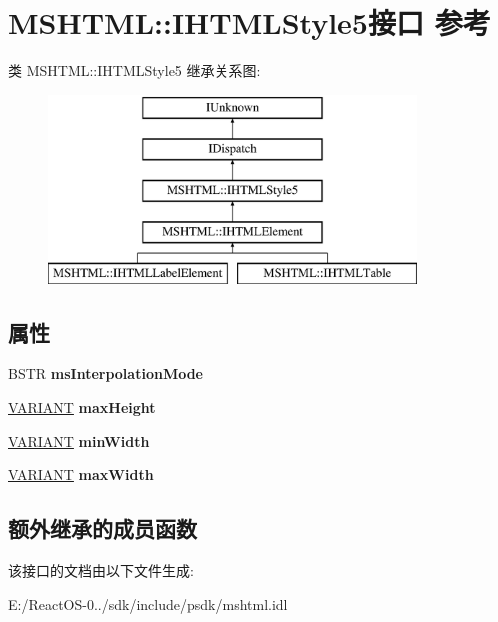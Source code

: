 \hypertarget{interface_m_s_h_t_m_l_1_1_i_h_t_m_l_style5}{}\section{M\+S\+H\+T\+ML\+:\+:I\+H\+T\+M\+L\+Style5接口 参考}
\label{interface_m_s_h_t_m_l_1_1_i_h_t_m_l_style5}
类 M\+S\+H\+T\+ML\+:\+:I\+H\+T\+M\+L\+Style5 继承关系图\+:\begin{figure}[H]
\begin{center}
\leavevmode
\includegraphics[height=5.000000cm]{interface_m_s_h_t_m_l_1_1_i_h_t_m_l_style5}
\end{center}
\end{figure}
\subsection*{属性}
\begin{DoxyCompactItemize}
\item 
\mbox{\label{interface_m_s_h_t_m_l_1_1_i_h_t_m_l_style5_ab35fc7c27cc8a267cf51fcef077536b6}} 
B\+S\+TR {\bfseries ms\+Interpolation\+Mode}
\item 
\mbox{\label{interface_m_s_h_t_m_l_1_1_i_h_t_m_l_style5_a9d135dbc815090c6a2afc8c111ec98e2}} 
\hyperlink{structtag_v_a_r_i_a_n_t}{V\+A\+R\+I\+A\+NT} {\bfseries max\+Height}
\item 
\mbox{\label{interface_m_s_h_t_m_l_1_1_i_h_t_m_l_style5_adfc20d7ec1f38cf79634531f1e138b78}} 
\hyperlink{structtag_v_a_r_i_a_n_t}{V\+A\+R\+I\+A\+NT} {\bfseries min\+Width}
\item 
\mbox{\label{interface_m_s_h_t_m_l_1_1_i_h_t_m_l_style5_aabe7c8dc3aae2a92c0a1b007ef63921b}} 
\hyperlink{structtag_v_a_r_i_a_n_t}{V\+A\+R\+I\+A\+NT} {\bfseries max\+Width}
\end{DoxyCompactItemize}
\subsection*{额外继承的成员函数}


该接口的文档由以下文件生成\+:\begin{DoxyCompactItemize}
\item 
E\+:/\+React\+O\+S-\/0../sdk/include/psdk/mshtml.\+idl\end{DoxyCompactItemize}
